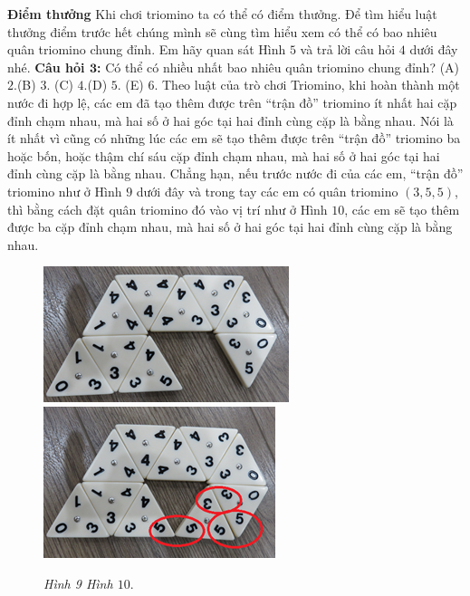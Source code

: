\newpage
\graphicspath{ {../choicungbi/domino2/} }

	{\bf {Điểm thưởng}}   
	\vskip 0.1cm
	Khi chơi triomino ta có thể có điểm thưởng.  Để tìm hiểu luật thưởng điểm trước hết chúng mình sẽ  cùng tìm hiểu xem có thể có bao nhiêu quân triomino chung đỉnh. Em hãy quan sát Hình $5$ và trả lời câu hỏi $4$ dưới  đây nhé.
	\vskip 0.1cm
	\textbf{Câu hỏi $\pmb{3}$:}
	\vskip 0.1cm
	Có thể có nhiều nhất bao nhiêu quân triomino chung đỉnh?
	\vskip 0.1cm
	\hspace*{0pt}(A)  $2.$\hspace*{35pt}(B)  $3.$
	\hspace*{35pt}(C)  $4.$\hspace*{35pt}(D)  $5.$
	\hspace*{35pt}(E)  $6.$
	\vskip 0.1cm
	Theo luật của trò chơi Triomino, khi hoàn thành một nước đi hợp lệ, các em đã tạo thêm được trên “trận đồ” triomino ít nhất hai cặp đỉnh chạm nhau, mà hai số ở hai góc tại hai đỉnh cùng cặp là bằng nhau. Nói là ít nhất vì cũng có những lúc các em sẽ tạo thêm được trên “trận đồ” triomino ba hoặc bốn, hoặc thậm chí sáu cặp đỉnh chạm nhau, mà hai số ở hai góc tại hai đỉnh cùng cặp là bằng nhau. Chẳng hạn, nếu trước nước đi của các em, “trận đồ” triomino như ở Hình $9$ dưới đây và trong tay các em có quân triomino  $(3, 5, 5)$, thì bằng cách đặt quân triomino đó vào vị trí như ở Hình $10$, các em sẽ tạo thêm được ba cặp đỉnh chạm nhau, mà hai số ở hai góc tại hai đỉnh cùng cặp là bằng nhau.
	\begin{figure}[H]
		\centering
		\vspace*{-5pt}
		\captionsetup{labelformat=empty, justification=centering}
		\includegraphics[height=0.2\textwidth]{h7a}\quad
		\includegraphics[height=0.2\textwidth]{h8a}
		\caption{\textit{\small Hình 9 \hspace*{75pt} Hình $10.$}}
		\vspace*{-10pt}
	\end{figure}
